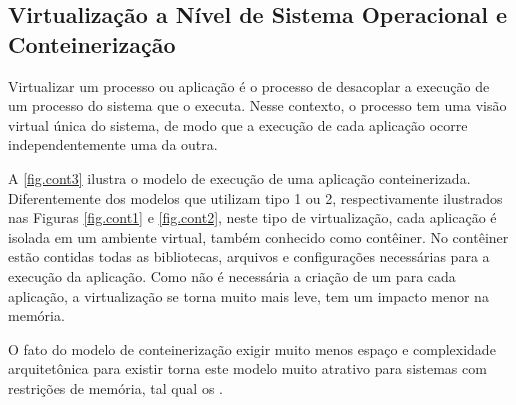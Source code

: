 \subsection{Virtualização a Nível de Sistema Operacional e Conteinerização}
Virtualizar um processo ou aplicação é o processo de desacoplar a execução de um processo do sistema que o executa. Nesse contexto, o processo tem uma visão virtual única do sistema, de modo que a execução de cada aplicação ocorre independentemente uma da outra.

A \autoref{fig.cont3} ilustra o modelo de execução de uma aplicação conteinerizada. Diferentemente dos modelos que utilizam \hypervisors tipo 1 ou 2, respectivamente ilustrados nas Figuras \ref{fig.cont1} e \ref{fig.cont2}, neste tipo de virtualização, cada aplicação é isolada em um ambiente virtual, também conhecido como contêiner. No contêiner estão contidas todas as bibliotecas, arquivos e configurações necessárias para a execução da aplicação. Como não é necessária a criação de um \so para cada aplicação, a virtualização se torna muito mais leve, \ie tem um impacto menor na memória.

O fato do modelo de conteinerização exigir muito menos espaço e complexidade arquitetônica para existir torna este modelo muito atrativo para sistemas com restrições de memória, tal qual os \lws.

